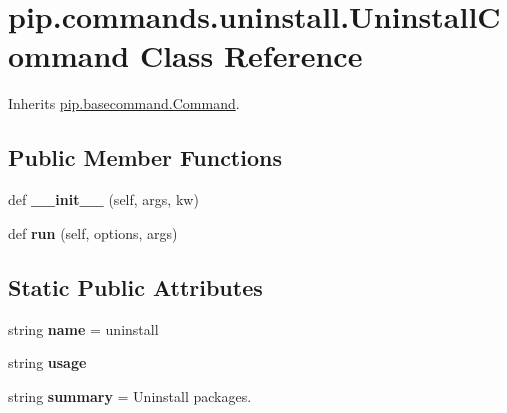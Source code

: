 \hypertarget{classpip_1_1commands_1_1uninstall_1_1_uninstall_command}{}\section{pip.\+commands.\+uninstall.\+Uninstall\+Command Class Reference}
\label{classpip_1_1commands_1_1uninstall_1_1_uninstall_command}


Inherits \hyperlink{classpip_1_1basecommand_1_1_command}{pip.\+basecommand.\+Command}.

\subsection*{Public Member Functions}
\begin{DoxyCompactItemize}
\item 
\mbox{\label{classpip_1_1commands_1_1uninstall_1_1_uninstall_command_a9e5f0e9943e9804d6ed45e77872a9be9}} 
def {\bfseries \+\_\+\+\_\+init\+\_\+\+\_\+} (self, args, kw)
\item 
\mbox{\label{classpip_1_1commands_1_1uninstall_1_1_uninstall_command_ad396cc717647fc1fb12bd84c9594c3fd}} 
def {\bfseries run} (self, options, args)
\end{DoxyCompactItemize}
\subsection*{Static Public Attributes}
\begin{DoxyCompactItemize}
\item 
\mbox{\label{classpip_1_1commands_1_1uninstall_1_1_uninstall_command_ac4931bf2de233aa7735b5db6f6d5f3c0}} 
string {\bfseries name} = \textquotesingle{}uninstall\textquotesingle{}
\item 
string {\bfseries usage}
\item 
\mbox{\label{classpip_1_1commands_1_1uninstall_1_1_uninstall_command_a837b59cfe885c4aa6e4fdbdca25b5d3e}} 
string {\bfseries summary} = \textquotesingle{}Uninstall packages.\textquotesingle{}
\end{DoxyCompactItemize}
